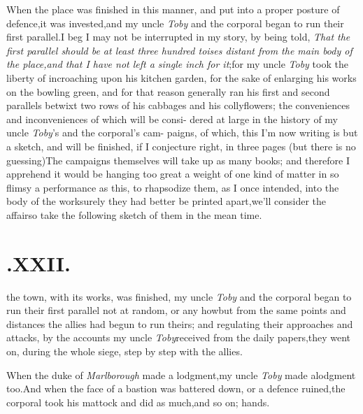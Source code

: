 \documentclass{article}
\begin{document}
When the place was finished in this 
manner, and put into a proper posture
of defence,\tsk it was invested,\tsk and my\break
uncle \textit{Toby} and the corporal began to run\break
their first parallel.\tsk I beg I may not\break
be interrupted in my story, by being\break
told, \textit{That the first parallel should be at least three
hundred toises distant from the main body of the place,\tsk and
that I have not left a single inch for it};\tsh for my
uncle \textit{Toby} took the liberty of incroaching upon his
kitchen garden, for the sake of enlarging his works on the
bowling green, and for that reason generally ran his first and
second parallels betwixt two rows of his cabbages and his
collyflowers; the conveniences and inconveniences of which will be
consi- dered at large in the history of my\break
uncle \textit{Toby}’s and the corporal’s cam-\break
paigns, of which,
this I’m now writing is but a sketch, and will be finished,
if\break
I conjecture right, in three pages (but there is no
guessing)\tsh The campaigns themselves will take up as
many books; and therefore I apprehend it would be hanging too great
a weight of one kind of matter in so flimsy a performance as this,
to rhapsodize them, as I once intended, into the body of the
work\tsh surely they had better be printed
apart,\break\tsh we’ll consider the affair\tsh so
take the following sketch of them in the mean time.

\enlargethispage\baselineskip

\section{.\enspace XXII.}

 the town, with its works,\break
was finished, my uncle \textit{Toby}\break
and the corporal began to run their first
parallel \tsh not at random, or any how\break \tsh but from the
same points and distances the allies had begun to run theirs;
and regulating their approaches and attacks, by the accounts my
uncle \textit{Toby}\break received from the daily papers,\tsk they
went on, during the whole siege, step by step with the allies.

When the duke of \textit{Marlborough} made a
lodgment,\tsh my uncle \textit{Toby} made a\break lodgment
too.\tsh And when the face of a bastion was battered down,
or a defence ruined,\tsk the corporal took his mattock and did as
much,\tsk and so on;\break
{}
\break
hands.
\end{document}
